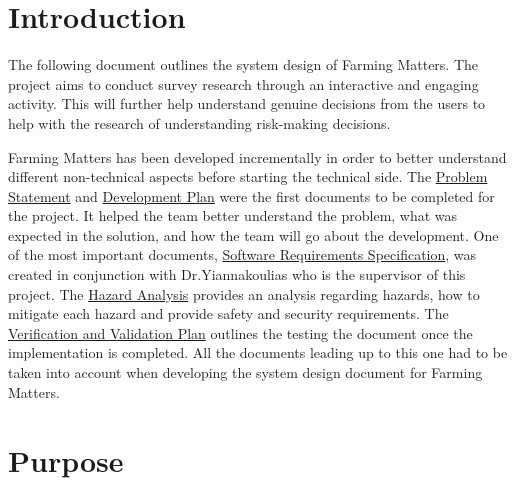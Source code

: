 \documentclass[12pt, titlepage]{article}
\begin{document}
\newpage

\tableofcontents

\newpage

\listoftables

\listoffigures

\newpage


\section{Introduction}
The following document outlines the system design of Farming Matters. The project aims to conduct survey research through an interactive and engaging activity. This will further help understand genuine decisions from the users to help with the research of understanding risk-making decisions. 

Farming Matters has been developed incrementally in order to better understand different non-technical aspects before starting the technical side. The \href{https://github.com/brandonduong/Farming-Matters/blob/main/docs/ProblemStatementAndGoals/ProblemStatement.pdf}{Problem Statement} and \href{https://github.com/brandonduong/Farming-Matters/blob/main/docs/DevelopmentPlan/DevelopmentPlan.pdf}{Development Plan} were the first documents to be completed for the project. It helped the team better understand the problem, what was expected in the solution, and how the team will go about the development. One of the most important documents, \href{https://github.com/brandonduong/Farming-Matters/blob/main/docs/SRS/SRS.pdf}{Software Requirements Specification}, was created in conjunction with Dr.Yiannakoulias who is the supervisor of this project. The \href{https://github.com/brandonduong/Farming-Matters/blob/main/docs/HazardAnalysis/HazardAnalysis.pdf}{Hazard Analysis} provides an analysis regarding hazards, how to mitigate each hazard and provide safety and security requirements. The \href{https://github.com/brandonduong/Farming-Matters/blob/main/docs/VnVPlan/VnVPlan.pdf}{Verification and Validation Plan} outlines the testing the document once the implementation is completed. All the documents leading up to this one had to be taken into account when developing the system design document for Farming Matters. 


\section{Purpose}
\end{document}

